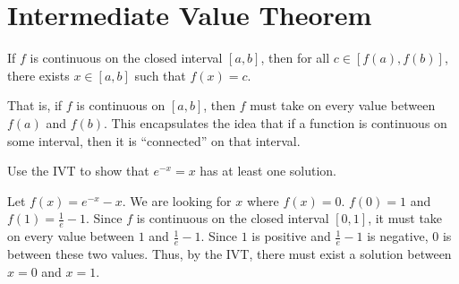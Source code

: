 \section{Intermediate Value Theorem}
\begin{theorem}
	If $f$ is continuous on the closed interval $[a,b]$, then for all $c \in [f(a), f(b)]$, there exists $x \in [a,b]$ such that $f(x) = c$.
\end{theorem}

That is, if $f$ is continuous on $[a,b]$, then $f$ must take on every value between $f(a)$ and $f(b)$.
This encapsulates the idea that if a function is continuous on some interval, then it is ``connected'' on that interval.

\begin{example}
	Use the IVT to show that $e^{-x} = x$ has at least one solution.
\end{example}
\begin{answer}
	Let $f(x) = e^{-x} - x$.
	We are looking for $x$ where $f(x) = 0$.
	$f(0) = 1$ and $f(1) = \frac{1}{e} - 1$.
	Since $f$ is continuous on the closed interval $[0,1]$, it must take on every value between $1$ and $\frac{1}{e} - 1$.
	Since $1$ is positive and $\frac{1}{e} - 1$ is negative, 0 is between these two values.
	Thus, by the IVT, there must exist a solution between $x=0$ and $x=1$.
\end{answer}